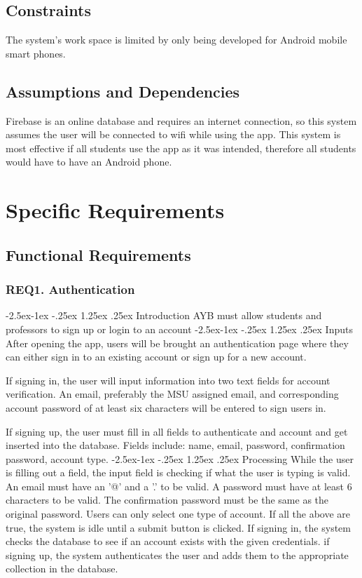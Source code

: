 \documentclass{article}
\makeatletter
\renewcommand\paragraph{\@startsection{paragraph}{4}{\z@}%
            {-2.5ex\@plus -1ex \@minus -.25ex}%
            {1.25ex \@plus .25ex}%
            {\normalfont\normalsize\bfseries}}
\makeatother
\begin{document}
  \subsection{Constraints}
  The system's work space is limited by only being developed for Android mobile smart phones. 
  \subsection{Assumptions and Dependencies}
  Firebase is an online database and requires an internet connection, so this system assumes the user
  will be connected to wifi while using the app. This system is most effective if all students use the
  app as it was intended, therefore all students would have to have an Android phone. 


  \section{Specific Requirements}
  \subsection{Functional Requirements} 
  \subsubsection{REQ1. Authentication}
  \paragraph{Introduction}
  AYB must allow students and professors to sign up or login to an account
  \paragraph{Inputs}
  After opening the app, users will be brought an authentication page where they can either sign in to 
  an existing account or sign up for a new account. 

  If signing in, the user will input information into two text fields for account verification. An email,
  preferably the MSU assigned email, and corresponding account password of at least six characters will 
  be entered to sign users in.

  If signing up, the user must fill in all fields to authenticate and account and get inserted into the 
  database. Fields include: name, email, password, confirmation password, account type.
  \paragraph{Processing}
  While the user is filling out a field, the input field is checking if what the user is typing is valid.
  An email must have an '@' and a '.' to be valid.
  A password must have at least 6 characters to be valid.
  The confirmation password must be the same as the original password.
  Users can only select one type of account.
  If all the above are true, the system is idle until a submit button is clicked.
  If signing in, the system checks the database to see if an account exists with the given credentials.
  if signing up, the system authenticates the user and adds them to the appropriate collection in the 
  database.
\end{document}
